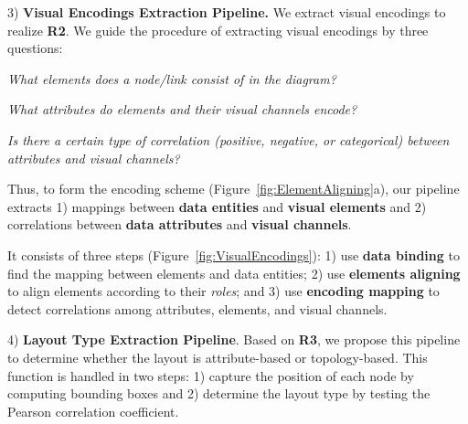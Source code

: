 3) \textbf{Visual Encodings Extraction Pipeline.} 
We extract visual encodings to realize \textbf{R2}. We guide the procedure of extracting visual encodings by three questions: 

\begin{compactenum}[\textbf{Q}1]
    \item \textit{What elements does a node/link consist of in the diagram?} \label{qstn:composition}
    
    \item \textit{What attributes do elements and their visual channels encode?} 
    \label{qstn:encodings}
    
    \item \textit{Is there a certain type of correlation (positive, negative, or categorical) between attributes and visual channels?}
    \label{qstn:correlation}
\end{compactenum}

Thus, to form the encoding scheme (Figure~\ref{fig:ElementAligning}a), our pipeline extracts 1) mappings between \textbf{data entities} and \textbf{visual elements} and 2) correlations between \textbf{data attributes} and \textbf{visual channels}.

It consists of three steps (Figure~\ref{fig:VisualEncodings}): 1) use \textbf{data binding} to find the mapping between elements and data entities; 2) use \textbf{elements aligning} to align elements according to their \textit{roles}; and 3) use \textbf{encoding mapping} to detect correlations among attributes, elements, and visual channels.

4) \textbf{Layout Type Extraction Pipeline}. 
Based on \textbf{R3}, we propose this pipeline to determine whether the layout is attribute-based or topology-based. This function is handled in two steps: 1) capture the position of each node by computing bounding boxes and 2) determine the layout type by testing the Pearson correlation coefficient.


